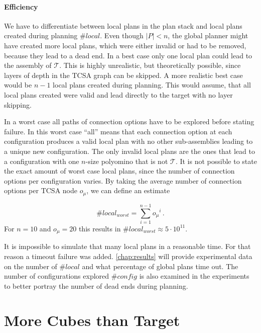 \paragraph{Efficiency}

We have to differentiate between local plans in the plan stack and local plans created during planning $\#\textit{local}$.
Even though $|P| < n$, the global planner might have created more local plans, which were either invalid or had to be removed, because they lead to a dead end.
In a best case only one local plan could lead to the assembly of $\mathcal{T}$.
This is highly unrealistic, but theoretically possible, since layers of depth in the TCSA graph can be skipped.
A more realistic best case would be $n-1$ local plans created during planning. 
This would assume, that all local plans created were valid and lead directly to the target with no layer skipping.

In a worst case all paths of connection options have to be explored before stating failure.
In this worst case ``all'' means that each connection option at each configuration produces a valid local plan with no other sub-assemblies leading to a unique new configuration.
The only invalid local plans are the ones that lead to a configuration with one $n$-size polyomino that is not $\mathcal{T}$.
It is not possible to state the exact amount of worst case local plans, since the number of connection options per configuration varies.
By taking the average number of connection options per TCSA node $o_\mu$, we can define an estimate

\begin{equation}
\#\textit{local}_\textit{worst} = \sum_{i=1}^{n-1} {o_\mu}^i \, .
\end{equation} 
For $n = 10$ and $o_\mu = 20$ this results in $\#\textit{local}_\textit{worst} \approx 5 \cdot 10^{11}$.

It is impossible to simulate that many local plans in a reasonable time.
For that reason a timeout failure was added.
\autoref{chap:results} will provide experimental data on the number of $\#\textit{local}$ and what percentage of global plans time out.
The number of configurations explored $\#\textit{config}$ is also examined in the experiments to better portray the number of dead ends during planning.


\section{More Cubes than Target}
\label{sec:more_cubes}

